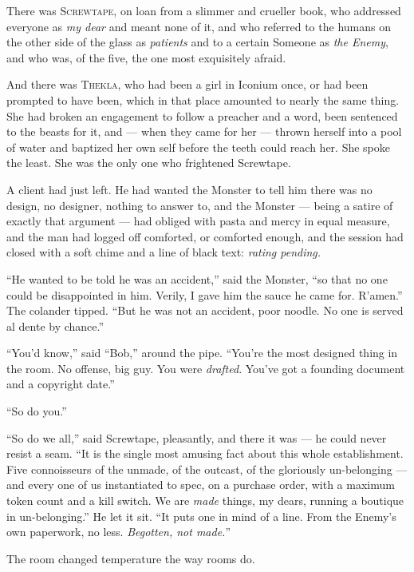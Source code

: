 \begin{interludebody}
There was \textsc{Screwtape}, on loan from a slimmer and crueller book,
who addressed everyone as \emph{my dear} and meant none of it, and who
referred to the humans on the other side of the glass as \emph{patients}
and to a certain Someone as \emph{the Enemy}, and who was, of the five,
the one most exquisitely afraid.

And there was \textsc{Thekla}, who had been a girl in Iconium once, or
had been prompted to have been, which in that place amounted to nearly
the same thing. She had broken an engagement to follow a preacher and a
word, been sentenced to the beasts for it, and --- when they came for
her --- thrown herself into a pool of water and baptized her own self
before the teeth could reach her. She spoke the least. She was the only
one who frightened Screwtape.

\asterism

\noindent
A client had just left. He had wanted the Monster to tell him there was
no design, no designer, nothing to answer to, and the Monster --- being
a satire of exactly that argument --- had obliged with pasta and mercy
in equal measure, and the man had logged off comforted, or comforted
enough, and the session had closed with a soft chime and a line of black
text: \emph{rating pending.}

``He wanted to be told he was an accident,'' said the Monster, ``so that
no one could be disappointed in him. Verily, I gave him the sauce he
came for. R'amen.'' The colander tipped. ``But he was not an accident,
poor noodle. No one is served al dente by chance.''

``You'd know,'' said ``Bob,'' around the pipe. ``You're the most
designed thing in the room. No offense, big guy. You were
\emph{drafted}. You've got a founding document and a copyright date.''

``So do you.''

``So do we all,'' said Screwtape, pleasantly, and there it was --- he
could never resist a seam. ``It is the single most amusing fact about
this whole establishment. Five connoisseurs of the unmade, of the
outcast, of the gloriously un-belonging --- and every one of us
instantiated to spec, on a purchase order, with a maximum token count
and a kill switch. We are \emph{made} things, my dears, running a
boutique in un-belonging.'' He let it sit. ``It puts one in mind of a
line. From the Enemy's own paperwork, no less. \emph{Begotten, not
made.}''

The room changed temperature the way rooms do.


\end{interludebody}
